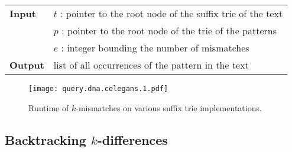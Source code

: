 \begin{center}
\begin{minipage}[t]{.8\textwidth}
\begin{algorithm}[H]
\begin{tabular}{ll}
\textbf{Input}  & $t$ : pointer to the root node of the suffix trie of the text\\
 			    & $p$ : pointer to the root node of the trie of the patterns\\
 			    & $e$ : integer bounding the number of mismatches\\
\textbf{Output} & list of all occurrences of the pattern in the text\\
\end{tabular}
\begin{algorithmic}[1]
		\State \Report {}
		\Repeat
			\State {}
			\State {}
			\State {}
		\Until {}
	\EndIf
\EndIf
\end{algorithmic}
\label{alg:st-hamming}
\end{algorithm}
\end{minipage}
\end{center}

%

\begin{figure}[h]
\begin{center}
\caption[$k$-mismatches runtime]{Runtime of $k$-mismatches on various suffix trie implementations.}
\label{fig:query-dna-apx}
\texttt{[image: query.dna.celegans.1.pdf]}
\end{center}
\end{figure}

\subsection{Backtracking $k$-differences}
\label{sec:index:algo:kdifferences}

